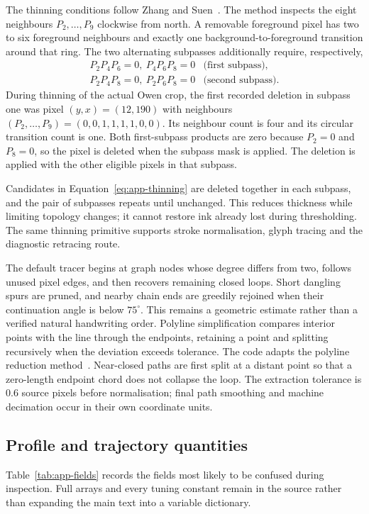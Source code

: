 The thinning conditions follow Zhang and Suen~\cite[p.~237]{zhang1984}. The method inspects the eight neighbours $P_2,\ldots,P_9$ clockwise from north. A removable foreground pixel has two to six foreground neighbours and exactly one background-to-foreground transition around that ring. The two alternating subpasses additionally require, respectively,
\begin{equation}
\begin{array}{ll}
P_2P_4P_6=0,\ P_4P_6P_8=0 &\text{(first subpass)},\\
P_2P_4P_8=0,\ P_2P_6P_8=0 &\text{(second subpass)}.
\end{array}
\label{eq:app-thinning}
\end{equation}
During thinning of the actual Owen crop, the first recorded deletion in subpass one was pixel $(y,x)=(12,190)$ with neighbours $(P_2,\ldots,P_9)=(0,0,1,1,1,1,0,0)$. Its neighbour count is four and its circular transition count is one. Both first-subpass products are zero because $P_2=0$ and $P_8=0$, so the pixel is deleted when the subpass mask is applied. The deletion is applied with the other eligible pixels in that subpass.

Candidates in Equation~\ref{eq:app-thinning} are deleted together in each subpass, and the pair of subpasses repeats until unchanged. This reduces thickness while limiting topology changes; it cannot restore ink already lost during thresholding. The same thinning primitive supports stroke normalisation, glyph tracing and the diagnostic retracing route.

The default tracer begins at graph nodes whose degree differs from two, follows unused pixel edges, and then recovers remaining closed loops. Short dangling spurs are pruned, and nearby chain ends are greedily rejoined when their continuation angle is below $75^\circ$. This remains a geometric estimate rather than a verified natural handwriting order. Polyline simplification compares interior points with the line through the endpoints, retaining a point and splitting recursively when the deviation exceeds tolerance. The code adapts the polyline reduction method~\cite{douglas1973}. Near-closed paths are first split at a distant point so that a zero-length endpoint chord does not collapse the loop. The extraction tolerance is 0.6 source pixels before normalisation; final path smoothing and machine decimation occur in their own coordinate units.

\subsection{Profile and trajectory quantities}
Table~\ref{tab:app-fields} records the fields most likely to be confused during inspection. Full arrays and every tuning constant remain in the source rather than expanding the main text into a variable dictionary.

